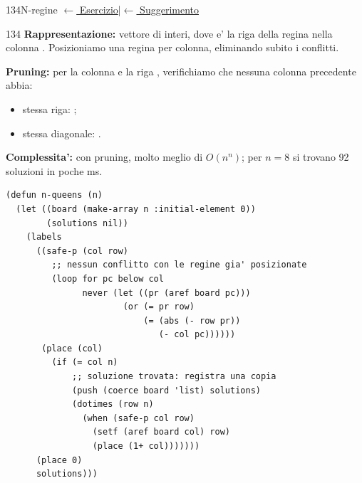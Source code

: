 \label{sol:134}
\begin{solbox}{134}{N-regine}
\small\color{black!55}\hyperref[ex:134]{$\leftarrow$ Esercizio}\enspace\textcolor{black!30}{|}\enspace\hyperref[hint:134]{$\leftarrow$ Suggerimento}\normalsize\color{black}
\begin{ragionamentoBox}{134}
\textbf{Rappresentazione:} vettore  di  interi, dove
 e' la riga della regina nella colonna .
Posizioniamo una regina per colonna, eliminando subito i conflitti.

\textbf{Pruning:} per la colonna  e la riga ,
verifichiamo che nessuna colonna precedente  abbia:
\begin{itemize}[leftmargin=2em]
  \item stessa riga: ;
  \item stessa diagonale: .
\end{itemize}
\textbf{Complessita':} con pruning, molto meglio di $O(n^n)$;
per $n=8$ si trovano 92 soluzioni in poche ms.
\end{ragionamentoBox}
\begin{lstlisting}
(defun n-queens (n)
  (let ((board (make-array n :initial-element 0))
        (solutions nil))
    (labels
      ((safe-p (col row)
         ;; nessun conflitto con le regine gia' posizionate
         (loop for pc below col
               never (let ((pr (aref board pc)))
                       (or (= pr row)
                           (= (abs (- row pr))
                              (- col pc))))))
       (place (col)
         (if (= col n)
             ;; soluzione trovata: registra una copia
             (push (coerce board 'list) solutions)
             (dotimes (row n)
               (when (safe-p col row)
                 (setf (aref board col) row)
                 (place (1+ col)))))))
      (place 0)
      solutions)))
\end{lstlisting}
\end{solbox}

